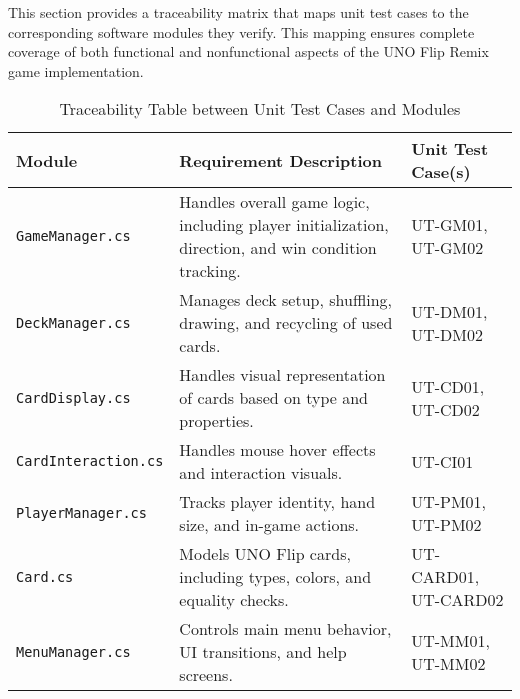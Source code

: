 \documentclass[12pt]{article}
\begin{document}
This section provides a traceability matrix that maps unit test cases to the corresponding software modules they verify. This mapping ensures complete coverage of both functional and nonfunctional aspects of the UNO Flip Remix game implementation.

\begin{table}[H]
\centering
\renewcommand{\arraystretch}{1.5}
\begin{tabular}{|l|p{5cm}|p{7.2cm}|}
\hline
\textbf{Module} & \textbf{Requirement Description} & \textbf{Unit Test Case(s)} \\ \hline

\texttt{GameManager.cs} & Handles overall game logic, including player initialization, direction, and win condition tracking. & 
UT-GM01, UT-GM02 \\ \hline

\texttt{DeckManager.cs} & Manages deck setup, shuffling, drawing, and recycling of used cards. & 
UT-DM01, UT-DM02 \\ \hline

\texttt{CardDisplay.cs} & Handles visual representation of cards based on type and properties. & 
UT-CD01, UT-CD02 \\ \hline

\texttt{CardInteraction.cs} & Handles mouse hover effects and interaction visuals. & 
UT-CI01 \\ \hline

\texttt{PlayerManager.cs} & Tracks player identity, hand size, and in-game actions. & 
UT-PM01, UT-PM02 \\ \hline

\texttt{Card.cs} & Models UNO Flip cards, including types, colors, and equality checks. & 
UT-CARD01, UT-CARD02 \\ \hline

\texttt{MenuManager.cs} & Controls main menu behavior, UI transitions, and help screens. & 
UT-MM01, UT-MM02 \\ \hline

\end{tabular}
\caption{Traceability Table between Unit Test Cases and Modules}
\end{table}
\end{document}
